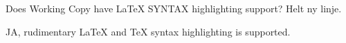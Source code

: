 \documentclass{article}
\begin{document}
\begin{question}
 Does Working Copy have LaTeX SYNTAX highlighting support?
 Helt ny linje.
\end{question}

\begin{answer}
 JA, rudimentary LaTeX and TeX syntax highlighting is supported.
\end{answer}

\end{document}
